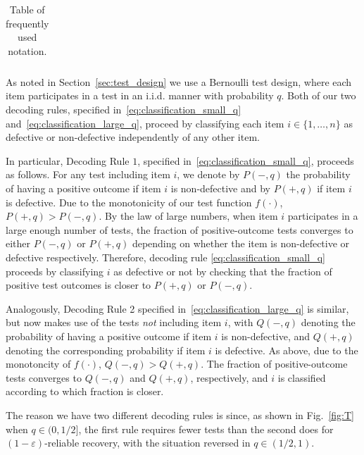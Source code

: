 \documentclass[onecolumn,letterpaper]{IEEEtran}
\newcommand{\cp}{{q}}
\newcommand{\pn}{{P(-,\cp)}}
\newcommand{\pp}{{P(+,\cp)}}
\newcommand{\pnm}{{Q(-,\cp)}}
\newcommand{\ppm}{{Q(+,\cp)}}
\begin{document}
\begin{table}
\begin{tabular}{|c|l|}
    \end{tabular} 
    \caption{Table of frequently used notation.} 
\end{table}   %


As noted in Section~\ref{sec:test_design}  we use a Bernoulli test design, where each item participates in a test in an i.i.d. manner with probability $\cp$. Both of our two decoding rules, specified in~\eqref{eq:classification_small_q} and~\eqref{eq:classification_large_q}, proceed by classifying each item $i \in \{1,\ldots,n\}$ as defective or non-defective independently of any other item.

In particular, Decoding Rule $1$, specified in~\eqref{eq:classification_small_q}, proceeds as follows. For any test including item $i$, we denote by $\pn$ the probability of having a positive outcome if item $i$ is non-defective and by $\pp$ if item $i$ is defective. Due to the monotonicity of our test function $f(\cdot)$, $\pp > \pn$.  By the law of large numbers, when item $i$ participates in a large enough number of tests, the fraction of positive-outcome tests converges to either $\pn$ or $\pp$ depending on whether the item is non-defective or defective respectively. Therefore, decoding rule \eqref{eq:classification_small_q} proceeds by classifying $i$ as defective or not by checking that the fraction of positive test outcomes is closer to $\pp$ or $\pn$. 

Analogously, Decoding Rule 2 specified in~\eqref{eq:classification_large_q} is similar, but now makes use of the tests {\it not} including item $i$, with $\pnm$ denoting the probability of having a positive outcome if item $i$ is non-defective, and $\ppm$ denoting the corresponding probability if item $i$ is defective. As above, due to the monotoncity of $f(\cdot)$, $\pnm > \ppm$. The fraction of positive-outcome tests converges to $\pnm$ and $\ppm$, respectively, and $i$ is classified according to which fraction is closer. 

The reason we have two different decoding rules is since, as shown in Fig.~\ref{fig:T} when $\cp \in (0,1/2]$,
 the first rule requires fewer tests than the second does for $(1-\varepsilon)$-reliable recovery, with the situation reversed in $\cp \in (1/2,1)$.
\end{document}
